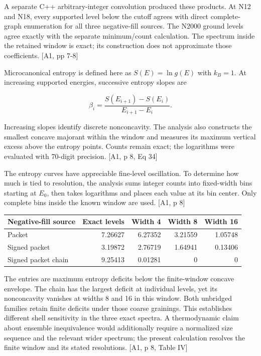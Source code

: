 A separate C++ arbitrary-integer convolution produced these products. At N12 and N18, every supported level below the cutoff agrees with direct complete-graph enumeration for all three negative-fill sources. The N2000 ground levels agree exactly with the separate minimum/count calculation. The spectrum inside the retained window is exact; its construction does not approximate those coefficients. {[}A1, pp 7-8{]}

Microcanonical entropy is defined here as \(S(E)=\ln g(E)\) with \(k_B=1\). At increasing supported energies, successive entropy slopes are

\[\beta_i=\frac{S(E_{i+1})-S(E_i)}{E_{i+1}-E_i}.\]

Increasing slopes identify discrete nonconcavity. The analysis also constructs the smallest concave majorant within the window and measures its maximum vertical excess above the entropy points. Counts remain exact; the logarithms were evaluated with 70-digit precision. {[}A1, p 8, Eq 34{]}

The entropy curves have appreciable fine-level oscillation. To determine how much is tied to resolution, the analysis sums integer counts into fixed-width bins starting at \(E_0\), then takes logarithms and places each value at its bin center. Only complete bins inside the known window are used. {[}A1, p 8{]}

\begin{table}[htbp]\centering\scriptsize
\begin{tabular}{@{}lrrrr@{}}
\toprule
Negative-fill source & Exact levels & Width 4 & Width 8 & Width 16 \\
\midrule
Packet & 7.26627 & 6.27352 & 3.21559 & 1.05748 \\
Signed packet & 3.19872 & 2.76719 & 1.64941 & 0.13406 \\
Signed packet chain & 9.25413 & 0.01281 & 0 & 0 \\
\bottomrule
\end{tabular}
\end{table}

The entries are maximum entropy deficits below the finite-window concave envelope. The chain has the largest deficit at individual levels, yet its nonconcavity vanishes at widths 8 and 16 in this window. Both unbridged families retain finite deficits under those coarse grainings. This establishes different shell sensitivity in the three exact spectra. A thermodynamic claim about ensemble inequivalence would additionally require a normalized size sequence and the relevant wider spectrum; the present calculation resolves the finite window and its stated resolutions. {[}A1, p 8, Table IV{]}

